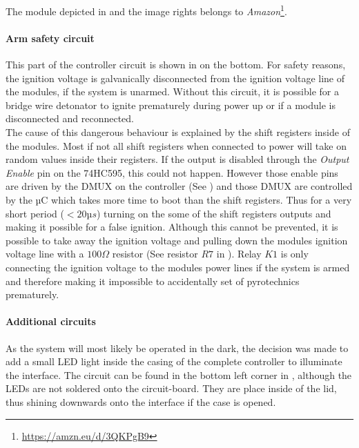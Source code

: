 \noindent The module depicted in  and the image rights belongs to \textit{Amazon}\footnote{\url{https://amzn.eu/d/3QKPgB9}}.\\


\pagebreak

\paragraph{Arm safety circuit}
This part of the controller circuit is shown in  on the bottom. For safety reasons, the ignition voltage is galvanically disconnected from the ignition voltage line of the modules, if the system is unarmed. Without this circuit, it is possible for a bridge wire detonator to ignite prematurely during power up or if a module is disconnected and reconnected. \\
\noindent The cause of this dangerous behaviour is explained by the shift registers inside of the modules. Most if not all shift registers when connected to power will take on random values inside their registers. If the output is disabled through the \textit{Output Enable} pin on the 74HC595, this could not happen. However those enable pins are driven by the DMUX on the controller (See ) and those DMUX are controlled by the µC which takes more time to boot than the shift registers. Thus for a very short period ($<20µs$) turning on the some of the shift registers outputs and making it possible for a false ignition. Although this cannot be prevented, it is possible to take away the ignition voltage and pulling down the modules ignition voltage line with a $100\Omega$ resistor (See resistor $R7$ in ). Relay $K1$ is only connecting the ignition voltage to the modules power lines if the system is armed and therefore making it impossible to accidentally set of pyrotechnics prematurely.

\paragraph{Additional circuits}
As the system will most likely be operated in the dark, the decision was made to add a small LED light inside the casing of the complete controller to illuminate the interface. The circuit can be found in the bottom left corner in , although the LEDs are not soldered onto the circuit-board. They are place inside of the lid, thus shining downwards onto the interface if the case is opened.

